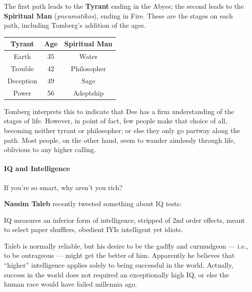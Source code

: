 The first path leads to the \textbf{Tyrant} ending in the Abyss; the second leads to the \textbf{Spiritual Man} (\emph{pneumatikos}), ending in Fire. These are the stages on each path, including Tomberg's addition of the ages.

\begin{table}[h]\small\centering
\begin{tabular}{ccc}
\toprule
Tyrant & Age & Spiritual Man \\\midrule

Earth & 35 & Water \\

Trouble & 42 & Philosopher \\

Deception & 49 & Sage \\

Power & 56 & Adeptship\\\bottomrule
\end{tabular}
\end{table}

Tomberg interprets this to indicate that Dee has a firm understanding of the stages of life. However, in point of fact, few people make that choice of all, becoming neither tyrant or philosopher; or else they only go partway along the path. Most people, on the other hand, seem to wander aimlessly through life, oblivious to any higher calling.

\paragraph{IQ and Intelligence}


\begin{quotex}
If you're so smart, why aren't you rich?
\end{quotex}


\textbf{Nassim Taleb} recently tweeted something about IQ tests:


\begin{quotex}
IQ measures an inferior form of intelligence, stripped of 2nd order effects, meant to select paper shufflers, obedient IYIs intelligent yet idiots.
\end{quotex}


Taleb is normally reliable, but his desire to be the gadfly and curmudgeon --- i.e., to be outrageous --- might get the better of him. Apparently he believes that ``higher'' intelligence applies solely to being successful in the world. Actually, success in the world does not required an exceptionally high IQ, or else the human race would have failed millennia ago.

